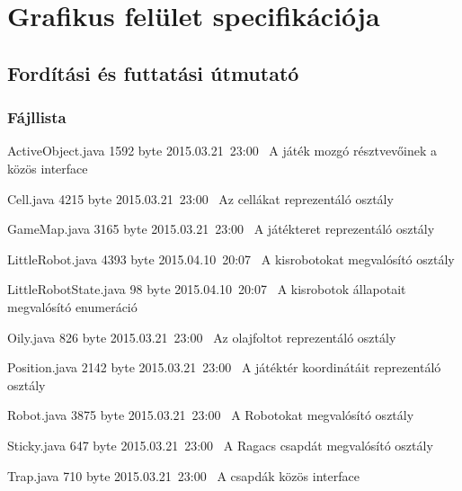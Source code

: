 %
\chapter{Grafikus felület specifikációja}

\thispagestyle{fancy}

\section{Fordítási és futtatási útmutató}

\subsection{Fájllista}

\begin{fajllista}

\fajl
{ActiveObject.java} %
{1592 byte} %
{2015.03.21~23:00~} %
{A játék mozgó résztvevőinek a közös interface} %

\fajl
{Cell.java} %
{4215 byte} %
{2015.03.21~23:00~} %
{Az cellákat reprezentáló osztály} %

\fajl
{GameMap.java} %
{3165 byte} %
{2015.03.21~23:00~} %
{A játékteret reprezentáló osztály} %

\fajl
{LittleRobot.java}
{4393 byte}
{2015.04.10~20:07~}
{A kisrobotokat megvalósító osztály}

\fajl
{LittleRobotState.java}
{98 byte}
{2015.04.10~20:07~}
{A kisrobotok állapotait megvalósító enumeráció}

\fajl
{Oily.java} %
{826 byte} %
{2015.03.21~23:00~} %
{Az olajfoltot reprezentáló osztály} %

\fajl
{Position.java} %
{2142 byte} %
{2015.03.21~23:00~} %
{A játéktér koordinátáit reprezentáló osztály} %

\fajl
{Robot.java} %
{3875 byte} %
{2015.03.21~23:00~} %
{A Robotokat megvalósító osztály} %

\fajl
{Sticky.java} %
{647 byte} %
{2015.03.21~23:00~} %
{A Ragacs csapdát megvalósító osztály} %

\fajl
{Trap.java} %
{710 byte} %
{2015.03.21~23:00~} %
{A csapdák közös interface} %


\end{fajllista}
